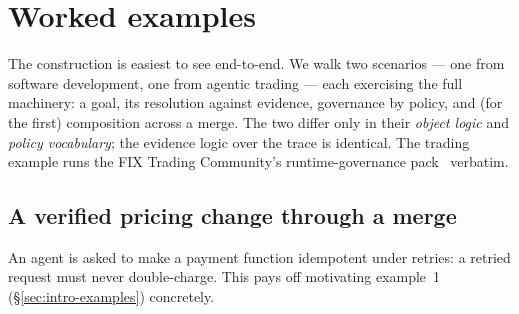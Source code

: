 \section{Worked examples}\label{sec:examples}

The construction is easiest to see end-to-end. We walk two scenarios --- one from software development, one
from agentic trading --- each exercising the full machinery: a goal, its resolution against evidence,
governance by policy, and (for the first) composition across a merge. The two differ only in their
\emph{object logic} and \emph{policy vocabulary}; the evidence logic over the trace is identical. The trading
example runs the FIX Trading Community's runtime-governance pack~\cite{ponensfix} verbatim.

\subsection{A verified pricing change through a merge}\label{sec:examples-coding}

An agent is asked to make a payment function  idempotent under retries: a retried request must
never double-charge. This pays off motivating example~1 (\S\ref{sec:intro-examples}) concretely.

